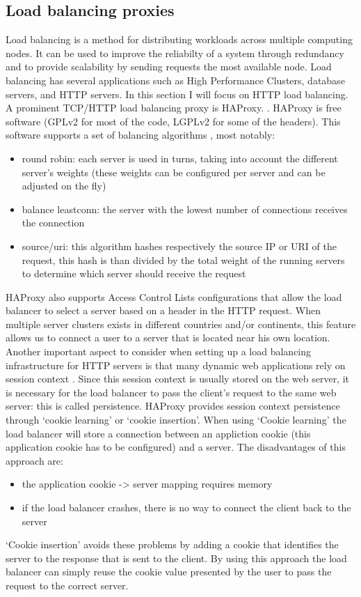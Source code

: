 \documentclass[12pt]{report}
\begin{document}
\subsection{Load balancing proxies}
Load balancing is a method for distributing workloads across multiple
computing nodes. It can be used to improve the reliabilty of a system through
redundancy and to provide scalability by sending requests the most
available node.
Load balancing has several applications such as High Performance
Clusters, database servers, and HTTP servers. In this section I will
focus on HTTP load balancing.
A prominent TCP/HTTP load balancing proxy is HAProxy.
\cite{haproxy:2013}. HAProxy is free software (GPLv2 for most of the
code, LGPLv2 for some of the headers). This software supports a set of
balancing algorithms \cite{tarreau:2006}, most notably:
\begin{itemize}
  \item round robin: each server is used in turns, taking into account
    the different server's weights (these weights can be configured
    per server and can be adjusted on the fly)
  \item balance leastconn: the server with the lowest number of connections receives the connection
  \item source/uri: this algorithm hashes respectively the source IP
    or URI of the request, this hash is than divided by the total
    weight of the running servers to determine which server should
    receive the request
\end{itemize}
HAProxy also supports Access Control Lists configurations that allow
the load balancer to select a server based on a header in the HTTP
request. When multiple server clusters exists in different countries
and/or continents, this feature allows us to connect a user to a
server that is located near his own location.
Another important aspect to consider when setting up a load balancing
infrastructure for HTTP servers is that many dynamic web applications
rely on session context \cite{tarreau:2006}. Since this session context is usually stored
on the web server, it is necessary for the load balancer to pass the
client's request to the same web server: this is called persistence.
HAProxy provides session context persistence through `cookie
learning' or `cookie insertion'. When using `Cookie learning' the load
balancer will store a connection between an appliction cookie (this
application cookie has to be configured) and a server. The
disadvantages of this approach are:
\begin{itemize}
  \item the application cookie -> server mapping requires memory
  \item if the load balancer crashes, there is no way to connect the
    client back to the server
\end{itemize}
`Cookie insertion' avoids these problems by adding a cookie that
identifies the server to the response that is sent to the client. By
using this approach the load balancer can simply reuse the
cookie value presented by the user to pass the request to the correct
server.
\end{document}

